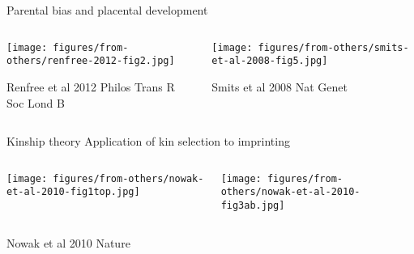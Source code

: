 \documentclass{beamer}
\begin{document}
\begin{frame}[label=igf2-imprint-evol]{Parental bias and placental development}{}
\begin{columns}[t]
\begin{column}{0.4\textwidth}

\texttt{[image: figures/from-others/renfree-2012-fig2.jpg]}

{\tiny Renfree et al 2012 Philos Trans R Soc Lond B}

\end{column}

\begin{column}{0.6\textwidth}

\texttt{[image: figures/from-others/smits-et-al-2008-fig5.jpg]}

{\tiny Smits et al 2008 Nat Genet}
\end{column}
\end{columns}
\begin{center}
\end{center}
\end{frame}

\begin{frame}[label=kinship-theory]{Kinship theory}
{Application of kin selection to imprinting}
\begin{center}
\begin{columns}[t]
\begin{column}{0.5\textwidth}

\texttt{[image: figures/from-others/nowak-et-al-2010-fig1top.jpg]}
\end{column}

\begin{column}{0.5\textwidth}

\texttt{[image: figures/from-others/nowak-et-al-2010-fig3ab.jpg]}
\end{column}
\end{columns}
{\tiny Nowak et al 2010 Nature}
\end{center}
\end{frame}
\end{document}
